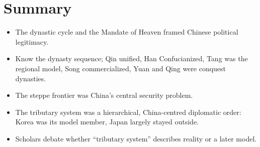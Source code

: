 \section*{Summary}
\begin{itemize}
  \item The dynastic cycle and the Mandate of Heaven framed Chinese political legitimacy.
  \item Know the dynasty sequence; Qin unified, Han Confucianized, Tang was the regional
        model, Song commercialized, Yuan and Qing were conquest dynasties.
  \item The steppe frontier was China's central security problem.
  \item The tributary system was a hierarchical, China-centred diplomatic order: Korea was
        its model member, Japan largely stayed outside.
  \item Scholars debate whether ``tributary system'' describes reality or a later model.
\end{itemize}
